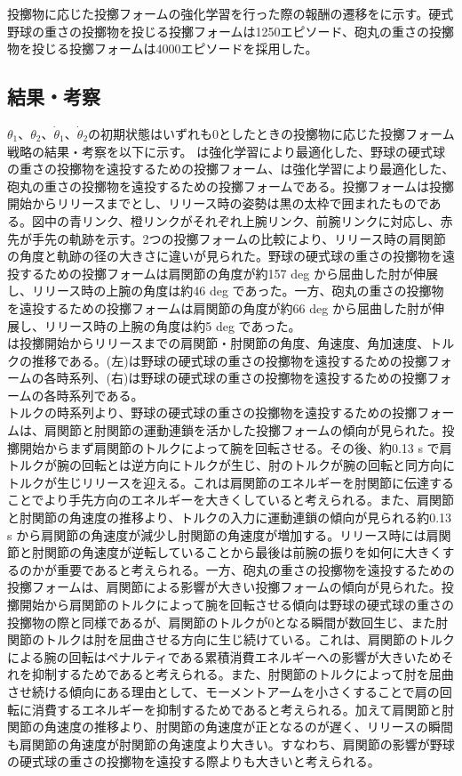 投擲物に応じた投擲フォームの強化学習を行った際の報酬の遷移をに示す。硬式野球の重さの投擲物を投じる投擲フォームは1250エピソード、砲丸の重さの投擲物を投じる投擲フォームは4000エピソードを採用した。

\subsection{結果・考察}
$\theta_{1}$、$\theta_{2}$、$\dot{\theta}_{1}$、$\dot{\theta}_{2}$の初期状態はいずれも0としたときの投擲物に応じた投擲フォーム戦略の結果・考察を以下に示す。
は強化学習により最適化した、野球の硬式球の重さの投擲物を遠投するための投擲フォーム、は強化学習により最適化した、砲丸の重さの投擲物を遠投するための投擲フォームである。投擲フォームは投擲開始からリリースまでとし、リリース時の姿勢は黒の太枠で囲まれたものである。図中の青リンク、橙リンクがそれぞれ上腕リンク、前腕リンクに対応し、赤先が手先の軌跡を示す。2つの投擲フォームの比較により、リリース時の肩関節の角度と軌跡の径の大きさに違いが見られた。野球の硬式球の重さの投擲物を遠投するための投擲フォームは肩関節の角度が約157 deg から屈曲した肘が伸展し、リリース時の上腕の角度は約46 deg であった。一方、砲丸の重さの投擲物を遠投するための投擲フォームは肩関節の角度が約66 deg から屈曲した肘が伸展し、リリース時の上腕の角度は約5 deg であった。\\
は投擲開始からリリースまでの肩関節・肘関節の角度、角速度、角加速度、トルクの推移である。(左)は野球の硬式球の重さの投擲物を遠投するための投擲フォームの各時系列、(右)は野球の硬式球の重さの投擲物を遠投するための投擲フォームの各時系列である。\\
トルクの時系列より、野球の硬式球の重さの投擲物を遠投するための投擲フォームは、肩関節と肘関節の運動連鎖を活かした投擲フォームの傾向が見られた。投擲開始からまず肩関節のトルクによって腕を回転させる。その後、約0.13 s で肩トルクが腕の回転とは逆方向にトルクが生じ、肘のトルクが腕の回転と同方向にトルクが生じリリースを迎える。これは肩関節のエネルギーを肘関節に伝達することでより手先方向のエネルギーを大きくしていると考えられる。また、肩関節と肘関節の角速度の推移より、トルクの入力に運動連鎖の傾向が見られる約0.13 s から肩関節の角速度が減少し肘関節の角速度が増加する。リリース時には肩関節と肘関節の角速度が逆転していることから最後は前腕の振りを如何に大きくするのかが重要であると考えられる。一方、砲丸の重さの投擲物を遠投するための投擲フォームは、肩関節による影響が大きい投擲フォームの傾向が見られた。投擲開始から肩関節のトルクによって腕を回転させる傾向は野球の硬式球の重さの投擲物の際と同様であるが、肩関節のトルクが0となる瞬間が数回生じ、また肘関節のトルクは肘を屈曲させる方向に生じ続けている。これは、肩関節のトルクによる腕の回転はペナルティである累積消費エネルギーへの影響が大きいためそれを抑制するためであると考えられる。また、肘関節のトルクによって肘を屈曲させ続ける傾向にある理由として、モーメントアームを小さくすることで肩の回転に消費するエネルギーを抑制するためであると考えられる。加えて肩関節と肘関節の角速度の推移より、肘関節の角速度が正となるのが遅く、リリースの瞬間も肩関節の角速度が肘関節の角速度より大きい。すなわち、肩関節の影響が野球の硬式球の重さの投擲物を遠投する際よりも大きいと考えられる。
